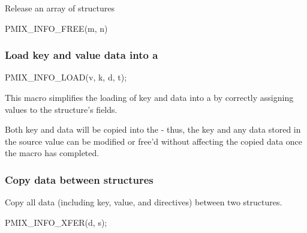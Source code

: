 Release an array of  structures

\cspecificstart
\begin{codepar}
PMIX_INFO_FREE(m, n)
\end{codepar}
\cspecificend

\begin{arglist}
\end{arglist}

\subsubsection{Load key and value data into a }

\cspecificstart
\begin{codepar}
PMIX_INFO_LOAD(v, k, d, t);
\end{codepar}
\cspecificend

\begin{arglist}
\end{arglist}

This macro simplifies the loading of key and data into a  by correctly assigning values to the structure's fields.

\adviceuserstart
Both key and data will be copied into the  - thus, the key and any data stored in the source value can be modified or free'd without affecting the copied data once the macro has completed.
\adviceuserend

\subsubsection{Copy data between  structures}

Copy all data (including key, value, and directives) between two  structures.

\cspecificstart
\begin{codepar}
PMIX_INFO_XFER(d, s);
\end{codepar}
\cspecificend


